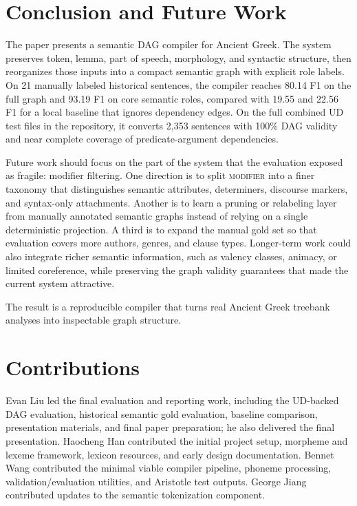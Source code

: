 \documentclass[11pt]{article}
\begin{document}
\section{Conclusion and Future Work}
The paper presents a semantic DAG compiler for Ancient Greek. The system preserves token,
lemma, part of speech, morphology, and syntactic structure, then reorganizes
those inputs into a compact semantic graph with explicit role labels. On 21
manually labeled historical sentences, the compiler reaches 80.14 F1 on the full
graph and 93.19 F1 on core semantic roles, compared with 19.55 and 22.56 F1 for
a local baseline that ignores dependency edges. On the full combined UD test
files in the repository, it converts 2,353 sentences with 100\% DAG validity and
near complete coverage of predicate-argument dependencies.

Future work should focus on the part of the system that the evaluation exposed as
fragile: modifier filtering. One direction is to split \textsc{modifier} into a
finer taxonomy that distinguishes semantic attributes, determiners, discourse
markers, and syntax-only attachments. Another is to learn a pruning or
relabeling layer from manually annotated semantic graphs instead of relying on a
single deterministic projection. A third is to expand the manual gold set so
that evaluation covers more authors, genres, and clause types. Longer-term work
could also integrate richer semantic information, such as valency classes,
animacy, or limited coreference, while preserving the graph validity guarantees
that made the current system attractive.

The result is a reproducible compiler that turns real Ancient Greek treebank
analyses into inspectable graph structure.

\section*{Contributions}
Evan Liu led the final evaluation and reporting work, including the UD-backed DAG
evaluation, historical semantic gold evaluation, baseline comparison,
presentation materials, and final paper preparation; he also delivered the final
presentation. Haocheng Han contributed the initial project setup, morpheme and
lexeme framework, lexicon resources, and early design documentation. Bennet Wang
contributed the minimal viable compiler pipeline, phoneme processing,
validation/evaluation utilities, and Aristotle test outputs. George Jiang
contributed updates to the semantic tokenization component.



\end{document}
